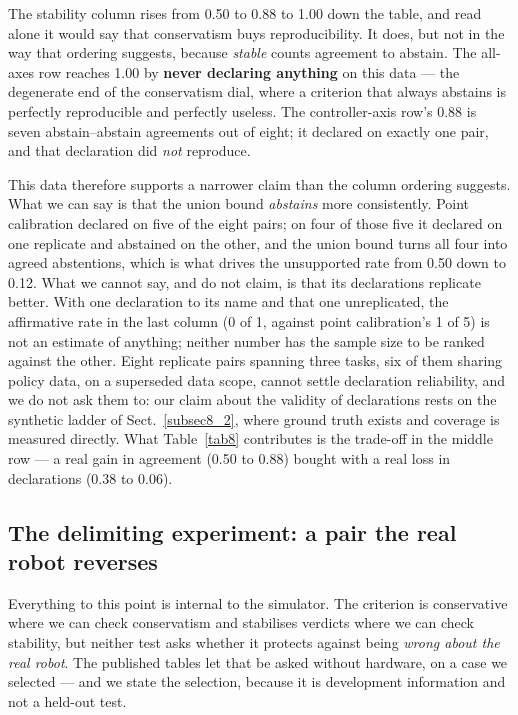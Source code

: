 \documentclass[pdflatex,iicol,sn-apa]{sn-jnl}
\theoremstyle{remark}
\begin{document}
The stability column rises from 0.50 to 0.88 to 1.00 down the table, and read alone it would say
that conservatism buys reproducibility. It does, but not in the way that ordering suggests, because
\emph{stable} counts agreement to abstain. The all-axes row reaches 1.00 by \textbf{never declaring
anything} on this data --- the degenerate end of the conservatism dial, where a criterion that always
abstains is perfectly reproducible and perfectly useless. The controller-axis row's 0.88 is seven
abstain--abstain agreements out of eight; it declared on exactly one pair, and that declaration did
\emph{not} reproduce.

This data therefore supports a narrower claim than the column ordering suggests. What we can say is
that the union bound \emph{abstains} more consistently. Point calibration declared on five of the
eight pairs; on four of those five it declared on one replicate and abstained on the other, and the
union bound turns all four into agreed abstentions, which is what drives the unsupported rate from
0.50 down to 0.12. What we cannot say, and do not claim, is that its declarations replicate better. With
one declaration to its name and that one unreplicated, the affirmative rate in the last column
(0 of 1, against point calibration's 1 of 5) is not an estimate of anything; neither number has the
sample size to be ranked against the other. Eight replicate pairs spanning three tasks, six of them
sharing policy data, on a superseded data scope, cannot settle declaration reliability, and we do not
ask them to: our claim about the validity of declarations rests on the synthetic ladder of
Sect.~\ref{subsec8_2}, where ground truth exists and coverage is measured directly. What Table~\ref{tab8} contributes is the trade-off in the middle row --- a real
gain in agreement (0.50 to 0.88) bought with a real loss in declarations (0.38 to 0.06).

\subsection{The delimiting experiment: a pair the real robot reverses}\label{subsec8_4}

Everything to this point is internal to the simulator. The criterion is conservative where we can
check conservatism and stabilises verdicts where we can check stability, but neither test asks
whether it protects against being \emph{wrong about the real robot}. The published tables let that be
asked without hardware, on a case we selected --- and we state the selection, because it is
development information and not a held-out test.
\end{document}
